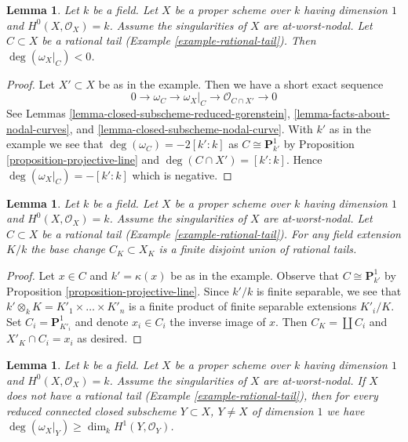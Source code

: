 \documentclass{stacks-project}
\theoremstyle{plain}
\newtheorem{lemma}[subsection]{Lemma}
\theoremstyle{definition}
\theoremstyle{remark}
\numberwithin{equation}{subsection}
\begin{document}
\begin{lemma}
\label{lemma-rational-tail-negative}
Let $k$ be a field. Let $X$ be a proper scheme over $k$ having dimension $1$
and $H^0(X, \mathcal{O}_X) = k$. Assume the singularities of $X$ are
at-worst-nodal. Let $C \subset X$ be a rational tail
(Example \ref{example-rational-tail}). Then $\deg(\omega_X|_C) < 0$.
\end{lemma}

\begin{proof}
Let $X' \subset X$ be as in the example. Then we have a short exact
sequence
$$
0 \to \omega_C \to \omega_X|_C \to \mathcal{O}_{C \cap X'} \to 0
$$
See Lemmas \ref{lemma-closed-subscheme-reduced-gorenstein},
\ref{lemma-facts-about-nodal-curves}, and
\ref{lemma-closed-subscheme-nodal-curve}.
With $k'$ as in the example we see that $\deg(\omega_C) = -2[k' : k]$
as $C \cong \mathbf{P}^1_{k'}$ by Proposition \ref{proposition-projective-line}
and $\deg(C \cap X') = [k' : k]$.
Hence $\deg(\omega_X|_C) = -[k' : k]$ which is negative.
\end{proof}

\begin{lemma}
\label{lemma-rational-tail-field-extension}
Let $k$ be a field. Let $X$ be a proper scheme over $k$ having dimension $1$
and $H^0(X, \mathcal{O}_X) = k$. Assume the singularities of $X$ are
at-worst-nodal. Let $C \subset X$ be a rational tail
(Example \ref{example-rational-tail}).
For any field extension $K/k$ the base change $C_K \subset X_K$
is a finite disjoint union of rational tails.
\end{lemma}

\begin{proof}
Let $x \in C$ and $k' = \kappa(x)$ be as in the example.
Observe that $C \cong \mathbf{P}^1_{k'}$ by
Proposition \ref{proposition-projective-line}.
Since $k'/k$ is finite separable, we see that
$k' \otimes_k K = K'_1 \times \ldots \times K'_n$
is a finite product of finite separable extensions $K'_i/K$.
Set $C_i = \mathbf{P}^1_{K'_i}$ and denote $x_i \in C_i$
the inverse image of $x$. Then $C_K = \coprod C_i$ and
$X'_K \cap C_i = x_i$ as desired.
\end{proof}

\begin{lemma}
\label{lemma-no-rational-tail}
Let $k$ be a field. Let $X$ be a proper scheme over $k$ having dimension $1$
and $H^0(X, \mathcal{O}_X) = k$. Assume the singularities of $X$ are
at-worst-nodal. If $X$ does not have a rational tail
(Example \ref{example-rational-tail}),
then for every reduced connected closed subscheme
$Y \subset X$, $Y \not = X$ of dimension $1$ we have
$\deg(\omega_X|_Y) \geq \dim_k H^1(Y, \mathcal{O}_Y)$.
\end{lemma}
\end{document}
